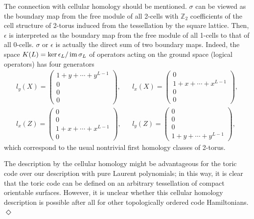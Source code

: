 \begin{example}
The connection with cellular homology should be mentioned.
$\sigma$ can be viewed as the boundary map
from the free module of all 2-cells with $\mathbb{Z}_2$ coefficients
of the cell structure of 2-torus
induced from the tessellation by the square lattice.
Then, $\epsilon$ is interpreted as the boundary map from the free module of all 1-cells
to that of all 0-cells.
$\sigma$ or $\epsilon$ is actually the direct sum of two boundary maps.
Indeed, the space 
$K(L) = \ker \epsilon_L / \mathop{\mathrm{im}}\nolimits \sigma_L$
of operators acting on the ground space (logical operators)
has four generators
\begin{align*}
 l_y(X) = \begin{pmatrix} 1+y+\cdots+y^{L-1} \\ 0 \\ 0 \\ 0 \end{pmatrix}, & & 
 l_x(X) = \begin{pmatrix} 0 \\ 1+ x+ \cdots + x^{L-1} \\ 0 \\ 0 \end{pmatrix}, \\
 l_x(Z) = \begin{pmatrix} 0 \\ 0 \\ 1+x+\cdots+x^{L-1} \\ 0 \end{pmatrix}, & &
 l_y(Z) = \begin{pmatrix} 0 \\ 0 \\ 0 \\ 1+y+\cdots+y^{L-1} \end{pmatrix},
\end{align*}
which correspond to the usual nontrivial first homology classes of 2-torus.

The description by the cellular homology might be advantageous for the toric code
over our description with pure Laurent polynomials;
in this way, it is clear that the toric code can be defined on
an arbitrary tessellation of compact orientable surfaces.
However, it is unclear whether this cellular homology description
is possible after all for other topologically ordered code Hamiltonians.
\hfill $\Diamond$
\end{example}

